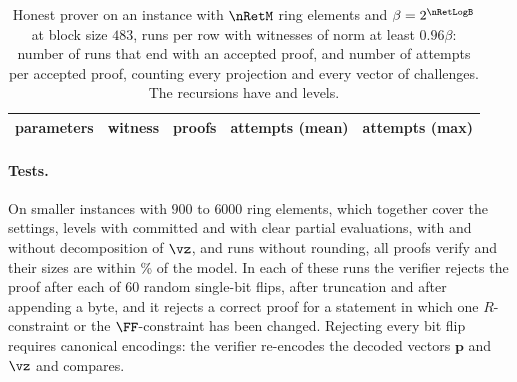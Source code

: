 \begin{table}[t]
\centering\small
\begin{tabular}{@{}llrrr@{}}
\toprule
parameters & witness & proofs & attempts (mean) & attempts (max)\\
\midrule

\bottomrule
\end{tabular}
\caption{Honest prover on an instance with $\nRetM$ ring elements and $\beta=2^{\nRetLogB}$ at block size $483$, \nRetRuns{} runs per row with witnesses of norm at least $0.96\beta$: number of runs that end with an accepted proof, and number of attempts per accepted proof, counting every projection and every vector of challenges. The recursions have \nRetLevOpt{} and \nRetLevGc{} levels.}
\label{tab:retries}
\end{table}

\paragraph{Tests.}
On \nTestN{} smaller instances with $900$ to $6000$ ring elements, which together cover the settings, levels with committed and with clear partial evaluations, with and without decomposition of $\vz$, and runs without rounding, all proofs verify and their sizes are within \nTestDev\% of the model. In each of these runs the verifier rejects the proof after each of $60$ random single-bit flips, after truncation and after appending a byte, and it rejects a correct proof for a statement in which one $R$-constraint or the $\FF$-constraint has been changed. Rejecting every bit flip requires canonical encodings: the verifier re-encodes the decoded vectors $\mathbf p$ and $\vz$ and compares.
